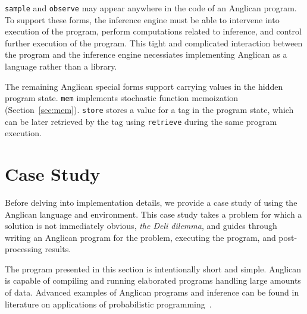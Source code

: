 \documentclass[preprint]{sigplanconf}
\begin{document}

\texttt{sample} and \texttt{observe} may appear anywhere in the
code of an Anglican program. To support these forms, the
inference engine must be able to intervene into execution of the
program, perform computations related to inference, and control
further execution of the program. This tight and complicated
interaction between the program and the inference engine
necessiates implementing Anglican as a language rather than a
library.

The remaining Anglican special forms support carrying values in
the hidden program state. \texttt{mem} implements stochastic
function  memoization (Section~\ref{sec:mem}). \texttt{store}
stores a value for a tag in the program state, which can be
later retrieved by the tag using \texttt{retrieve} during the same
program execution.

\section{Case Study}
\label{seq:study}

Before delving into implementation details, we provide a case
study of using the Anglican language and environment. This case
study takes a problem for which a solution is not immediately
obvious, \textit{the Deli dilemma}, and guides through writing
an Anglican program for the problem, executing the program, and
post-processing results. 

The program presented in this section is intentionally short and
simple. Anglican is capable of compiling and running elaborated
programs handling large amounts of data. Advanced examples of
Anglican programs and inference can be found in literature on
applications of probabilistic programming~\cite{PLW15, P16, MPT+16}.
\end{document}
